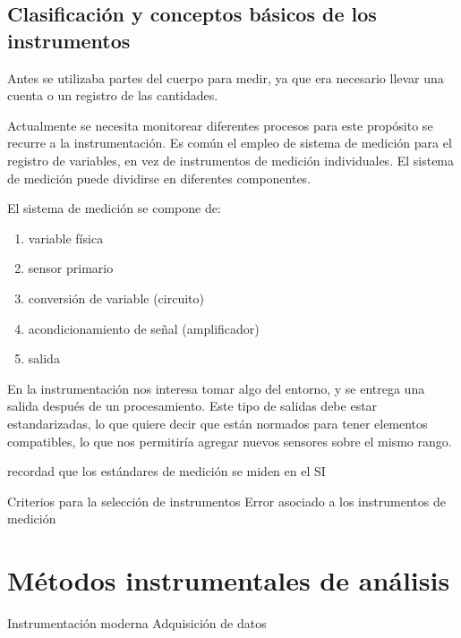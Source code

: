 \documentclass[11pt]{report}
\theoremstyle{plain}
\theoremstyle{definition}
\begin{document}
\section{Clasificación y conceptos básicos de los instrumentos}

Antes se utilizaba partes del cuerpo para medir, ya que era necesario llevar una cuenta o un registro de las cantidades.

Actualmente se necesita monitorear diferentes procesos para este propósito se recurre a la instrumentación.
Es común el empleo de sistema de medición para el registro de variables, en vez de instrumentos de medición individuales.
El sistema de medición puede dividirse en diferentes componentes.

El sistema de medición se compone de:
\begin{enumerate}
	\item variable física
	\item sensor primario
	\item conversión de variable (circuito)
	\item acondicionamiento de señal (amplificador)
	\item salida
\end{enumerate}

En la instrumentación nos interesa tomar algo del entorno, y se entrega una salida después de un procesamiento. Este tipo de salidas debe estar estandarizadas, lo que quiere decir que están normados para tener elementos compatibles, lo que nos permitiría agregar nuevos sensores sobre el mismo rango.

recordad que los estándares de medición se miden en el SI

Criterios para la selección de instrumentos
Error asociado a los instrumentos de medición




\chapter{Métodos instrumentales de análisis}

Instrumentación moderna
Adquisición de datos


\end{document}
